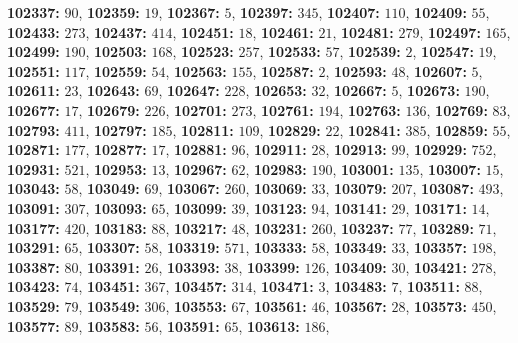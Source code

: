 \textsf{\bfseries 102337:} $90$, \textsf{\bfseries 102359:} $19$, \textsf{\bfseries 102367:} $5$, \textsf{\bfseries 102397:} $345$, \textsf{\bfseries 102407:} $110$, \textsf{\bfseries 102409:} $55$, \textsf{\bfseries 102433:} $273$, \textsf{\bfseries 102437:} $414$, \textsf{\bfseries 102451:} $18$, \textsf{\bfseries 102461:} $21$, \textsf{\bfseries 102481:} $279$, \textsf{\bfseries 102497:} $165$, \textsf{\bfseries 102499:} $190$, \textsf{\bfseries 102503:} $168$, \textsf{\bfseries 102523:} $257$, \textsf{\bfseries 102533:} $57$, \textsf{\bfseries 102539:} $2$, \textsf{\bfseries 102547:} $19$, \textsf{\bfseries 102551:} $117$, \textsf{\bfseries 102559:} $54$, \textsf{\bfseries 102563:} $155$, \textsf{\bfseries 102587:} $2$, \textsf{\bfseries 102593:} $48$, \textsf{\bfseries 102607:} $5$, \textsf{\bfseries 102611:} $23$, \textsf{\bfseries 102643:} $69$, \textsf{\bfseries 102647:} $228$, \textsf{\bfseries 102653:} $32$, \textsf{\bfseries 102667:} $5$, \textsf{\bfseries 102673:} $190$, \textsf{\bfseries 102677:} $17$, \textsf{\bfseries 102679:} $226$, \textsf{\bfseries 102701:} $273$, \textsf{\bfseries 102761:} $194$, \textsf{\bfseries 102763:} $136$, \textsf{\bfseries 102769:} $83$, \textsf{\bfseries 102793:} $411$, \textsf{\bfseries 102797:} $185$, \textsf{\bfseries 102811:} $109$, \textsf{\bfseries 102829:} $22$, \textsf{\bfseries 102841:} $385$, \textsf{\bfseries 102859:} $55$, \textsf{\bfseries 102871:} $177$, \textsf{\bfseries 102877:} $17$, \textsf{\bfseries 102881:} $96$, \textsf{\bfseries 102911:} $28$, \textsf{\bfseries 102913:} $99$, \textsf{\bfseries 102929:} $752$, \textsf{\bfseries 102931:} $521$, \textsf{\bfseries 102953:} $13$, \textsf{\bfseries 102967:} $62$, \textsf{\bfseries 102983:} $190$, \textsf{\bfseries 103001:} $135$, \textsf{\bfseries 103007:} $15$, \textsf{\bfseries 103043:} $58$, \textsf{\bfseries 103049:} $69$, \textsf{\bfseries 103067:} $260$, \textsf{\bfseries 103069:} $33$, \textsf{\bfseries 103079:} $207$, \textsf{\bfseries 103087:} $493$, \textsf{\bfseries 103091:} $307$, \textsf{\bfseries 103093:} $65$, \textsf{\bfseries 103099:} $39$, \textsf{\bfseries 103123:} $94$, \textsf{\bfseries 103141:} $29$, \textsf{\bfseries 103171:} $14$, \textsf{\bfseries 103177:} $420$, \textsf{\bfseries 103183:} $88$, \textsf{\bfseries 103217:} $48$, \textsf{\bfseries 103231:} $260$, \textsf{\bfseries 103237:} $77$, \textsf{\bfseries 103289:} $71$, \textsf{\bfseries 103291:} $65$, \textsf{\bfseries 103307:} $58$, \textsf{\bfseries 103319:} $571$, \textsf{\bfseries 103333:} $58$, \textsf{\bfseries 103349:} $33$, \textsf{\bfseries 103357:} $198$, \textsf{\bfseries 103387:} $80$, \textsf{\bfseries 103391:} $26$, \textsf{\bfseries 103393:} $38$, \textsf{\bfseries 103399:} $126$, \textsf{\bfseries 103409:} $30$, \textsf{\bfseries 103421:} $278$, \textsf{\bfseries 103423:} $74$, \textsf{\bfseries 103451:} $367$, \textsf{\bfseries 103457:} $314$, \textsf{\bfseries 103471:} $3$, \textsf{\bfseries 103483:} $7$, \textsf{\bfseries 103511:} $88$, \textsf{\bfseries 103529:} $79$, \textsf{\bfseries 103549:} $306$, \textsf{\bfseries 103553:} $67$, \textsf{\bfseries 103561:} $46$, \textsf{\bfseries 103567:} $28$, \textsf{\bfseries 103573:} $450$, \textsf{\bfseries 103577:} $89$, \textsf{\bfseries 103583:} $56$, \textsf{\bfseries 103591:} $65$, \textsf{\bfseries 103613:} $186$, 
